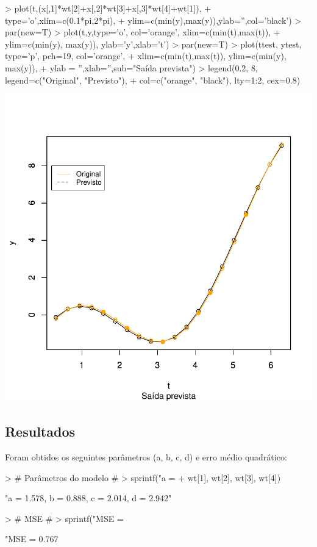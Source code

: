 \documentclass{article}
\begin{document}
\begin{Schunk}
\begin{Sinput}
> plot(t,(x[,1]*wt[2]+x[,2]*wt[3]+x[,3]*wt[4]+wt[1]),
+      type='o',xlim=c(0.1*pi,2*pi),
+      ylim=c(min(y),max(y)),ylab='',col='black')
> par(new=T)
> plot(t,y,type='o', col='orange', xlim=c(min(t),max(t)), 
+      ylim=c(min(y), max(y)), ylab='y',xlab='t')
> par(new=T)
> plot(ttest, ytest, type='p', pch=19, col='orange',
+      xlim=c(min(t),max(t)), ylim=c(min(y), max(y)), 
+      ylab = '',xlab='',sub="Saída prevista")
> legend(0.2, 8, legend=c("Original", "Previsto"),
+        col=c("orange", "black"), lty=1:2, cex=0.8)
\end{Sinput}
\end{Schunk}
\includegraphics{adaline-010}

\subsection{Resultados}
Foram obtidos os seguintes parâmetros (a, b, c, d) e erro médio quadrático:
\begin{Schunk}
\begin{Sinput}
> # Parâmetros do modelo #
> sprintf("a = %
+         wt[1], wt[2], wt[3], wt[4])
\end{Sinput}
\begin{Soutput}
[1] "a = 1.578, b = 0.888, c = 2.014, d = 2.942"
\end{Soutput}
\begin{Sinput}
> # MSE #
> sprintf("MSE = %
\end{Sinput}
\begin{Soutput}
[1] "MSE = 0.767%
\end{Soutput}
\end{Schunk}
\end{document}

